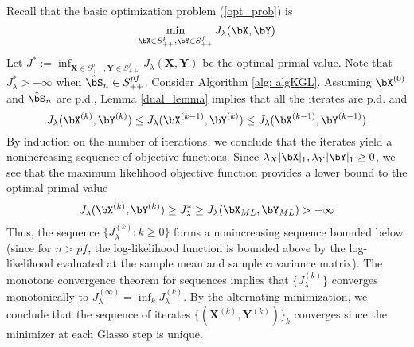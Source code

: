 \begin{IEEEproof}
	Recall that the basic optimization problem (\ref{opt_prob}) is
	\begin{equation*}
		\min_{\bX \in S_{++}^p, \bY \in S_{++}^f} J_\lambda(\bX,\bY)
	\end{equation*}
	Let $J^*:=\inf_{\mathbf{X} \in S_{++}^p, \mathbf{Y} \in S_{++}^f}{J_\lambda(\mathbf{X},\mathbf{Y})}$ be the optimal primal value. Note that $J_\lambda^* > -\infty$ when $\hat{\bS}_n \in S_{++}^{pf}$. Consider Algorithm \ref{alg: algKGL}. Assuming $\bX^{(0)}$ and $\hat{\bS}_n$ are p.d., Lemma \ref{dual_lemma} implies that all the iterates are p.d. and
	\begin{equation} \label{monotonicity}
		J_\lambda(\bX^{(k)},\bY^{(k)}) \leq	J_\lambda(\bX^{(k-1)},\bY^{(k)}) \leq J_\lambda(\bX^{(k-1)},\bY^{(k-1)})
	\end{equation}
	By induction on the number of iterations, we conclude that the iterates yield a nonincreasing sequence of objective functions. Since $\lambda_X |\bX|_1, \lambda_Y |\bY|_1 \geq 0$, we see that the maximum likelihood objective function provides a lower bound to the optimal primal value
	\begin{equation} \label{LB_ML}
		J_\lambda(\bX^{(k)},\bY^{(k)}) \geq J_\lambda^* \geq J_\lambda(\bX_{ML},\bY_{ML}) > -\infty
	\end{equation}
	Thus, the sequence $\{J_\lambda^{(k)}:k\geq 0\}$ forms a nonincreasing sequence bounded below (since for $n>pf$, the log-likelihood function is bounded above by the log-likelihood evaluated at the sample mean and sample covariance matrix). The monotone convergence theorem for sequences \cite{IntroRealAnalysis} implies that $\{J_\lambda^{(k)}\}$ converges monotonically to $J_\lambda^{(\infty)}=\inf_k{J_\lambda^{(k)}}$. By the alternating minimization, we conclude that the sequence of iterates $\{(\mathbf{X}^{(k)},\mathbf{Y}^{(k)})\}_k$ converges since the minimizer at each Glasso step is unique.
\end{IEEEproof}
